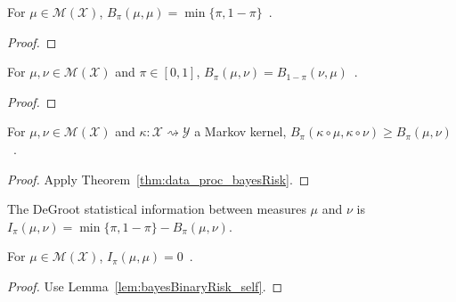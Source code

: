 \begin{lemma}
  \label{lem:bayesBinaryRisk_self}
  \leanok
  For $\mu \in \mathcal M(\mathcal X)$, $B_\pi(\mu, \mu) = \min\{\pi, 1-\pi\}$~.
\end{lemma}

\begin{proof}%
\uses{}
\end{proof}

\begin{lemma}
  \label{lem:bayesBinaryRisk_symm}
  \leanok
  For $\mu, \nu \in \mathcal M(\mathcal X)$ and $\pi \in [0,1]$, $B_\pi(\mu, \nu) = B_{1 - \pi}(\nu, \mu)$~.
\end{lemma}

\begin{proof}%
\uses{}

\end{proof}

\begin{theorem}
  \label{thm:data_proc_bayesBinaryRisk}
  \leanok
  For $\mu, \nu \in \mathcal M(\mathcal X)$ and $\kappa : \mathcal X \rightsquigarrow \mathcal Y$ a Markov kernel, $B_\pi(\kappa \circ \mu, \kappa \circ \nu) \ge B_\pi(\mu, \nu)$~.
\end{theorem}

\begin{proof}\leanok
{}
Apply Theorem~\ref{thm:data_proc_bayesRisk}.
\end{proof}

\begin{definition}
  \label{def:deGrootInfo}
  \leanok
  The DeGroot statistical information between measures $\mu$ and $\nu$ is $I_\pi(\mu, \nu) = \min\{\pi, 1 - \pi\} - B_\pi(\mu, \nu)$.
\end{definition}

\begin{lemma}
  \label{lem:deGrootInfo_self}
  For $\mu \in \mathcal M(\mathcal X)$, $I_\pi(\mu, \mu) = 0$~.
\end{lemma}

\begin{proof}%
{}
Use Lemma~\ref{lem:bayesBinaryRisk_self}.
\end{proof}

